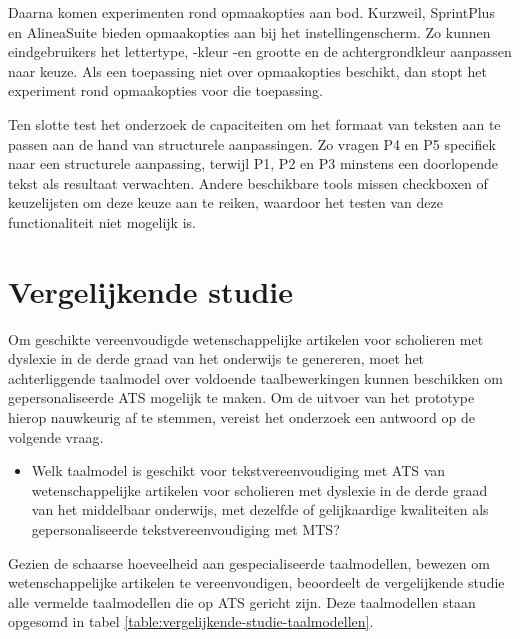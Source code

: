 \medspace

Daarna komen experimenten rond opmaakopties aan bod. Kurzweil, SprintPlus en AlineaSuite bieden opmaakopties aan bij het instellingenscherm. Zo kunnen eindgebruikers het lettertype, -kleur -en grootte en de achtergrondkleur aanpassen naar keuze. Als een toepassing niet over opmaakopties beschikt, dan stopt het experiment rond opmaakopties voor die toepassing.

\medspace

Ten slotte test het onderzoek de capaciteiten om het formaat van teksten aan te passen aan de hand van structurele aanpassingen. Zo vragen P4 en P5 specifiek naar een structurele aanpassing, terwijl P1, P2 en P3 minstens een doorlopende tekst als resultaat verwachten. Andere beschikbare tools missen checkboxen of keuzelijsten om deze keuze aan te reiken, waardoor het testen van deze functionaliteit niet mogelijk is.

\section{Vergelijkende studie}
\label{sec:vergelijkende-studie}

Om geschikte vereenvoudigde wetenschappelijke artikelen voor scholieren met dyslexie in de derde graad van het onderwijs te genereren, moet het achterliggende taalmodel over voldoende taalbewerkingen kunnen beschikken om gepersonaliseerde ATS mogelijk te maken. Om de uitvoer van het prototype hierop nauwkeurig af te stemmen, vereist het onderzoek een antwoord op de volgende vraag.

\begin{itemize}
	\item Welk taalmodel is geschikt voor tekstvereenvoudiging met ATS van wetenschappelijke artikelen voor scholieren met dyslexie in de derde graad van het middelbaar onderwijs, met dezelfde of gelijkaardige kwaliteiten als gepersonaliseerde tekstvereenvoudiging met MTS?
\end{itemize}

Gezien de schaarse hoeveelheid aan gespecialiseerde taalmodellen, bewezen om wetenschappelijke artikelen te vereenvoudigen, beoordeelt de vergelijkende studie alle vermelde taalmodellen die op ATS gericht zijn. Deze taalmodellen staan opgesomd in tabel \ref{table:vergelijkende-studie-taalmodellen}.

